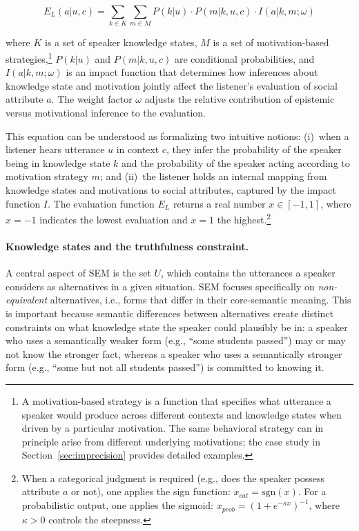 \documentclass[12pt,a4paper]{article}
\begin{document}
\begin{equation}
E_{L}(a|u,c) = \sum_{k \in K} \sum_{m \in M}
  P(k|u) \cdot P(m|k,u,c) \cdot I(a|k,m;\omega)
\label{eq1}
\end{equation}

\noindent where $K$ is a set of speaker knowledge states, $M$ is a set of
motivation-based strategies,\footnote{A motivation-based strategy is a function
that specifies what utterance a speaker would produce across different contexts
and knowledge states when driven by a particular motivation. The same behavioral
strategy can in principle arise from different underlying motivations; the case
study in Section~\ref{sec:imprecision} provides detailed examples.} $P(k|u)$
and $P(m|k,u,c)$ are conditional probabilities, and $I(a|k,m;\omega)$ is an
impact function that determines how inferences about knowledge state and
motivation jointly affect the listener's evaluation of social attribute $a$.
The weight factor $\omega$ adjusts the relative contribution of epistemic versus
motivational inference to the evaluation.

This equation can be understood as formalizing two intuitive notions: (i)~when
a listener hears utterance $u$ in context $c$, they infer the probability of
the speaker being in knowledge state $k$ and the probability of the speaker
acting according to motivation strategy $m$; and (ii)~the listener holds an
internal mapping from knowledge states and motivations to social attributes,
captured by the impact function $I$. The evaluation function $E_L$ returns a
real number $x \in [-1, 1]$, where $x = -1$ indicates the lowest evaluation
and $x = 1$ the highest.\footnote{When a categorical judgment is required
(e.g., does the speaker possess attribute $a$ or not), one applies the sign
function: $x_{cat} = \mathrm{sgn}(x)$. For a probabilistic output, one applies
the sigmoid: $x_{prob} = (1 + e^{-\kappa x})^{-1}$, where $\kappa > 0$ controls
the steepness.}

\paragraph{Knowledge states and the truthfulness constraint.}
A central aspect of SEM is the set $U$, which contains the utterances a speaker
considers as alternatives in a given situation. SEM focuses specifically on
\emph{non-equivalent} alternatives, i.e., forms that differ in their
core-semantic meaning. This is important because semantic differences between
alternatives create distinct constraints on what knowledge state the speaker
could plausibly be in: a speaker who uses a semantically weaker form (e.g.,
``some students passed'') may or may not know the stronger fact, whereas a
speaker who uses a semantically stronger form (e.g., ``some but not all
students passed'') is committed to knowing it.
\end{document}
